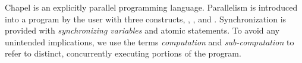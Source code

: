 Chapel is an explicitly parallel programming language. Parallelism is
introduced into a program by the user with three constructs,
, , and .  Synchronization is
provided with \emph{synchronizing variables} and atomic statements. To
avoid any unintended implications, we use the terms \emph{computation}
and \emph{sub-computation} to refer to distinct, concurrently
executing portions of the program.

